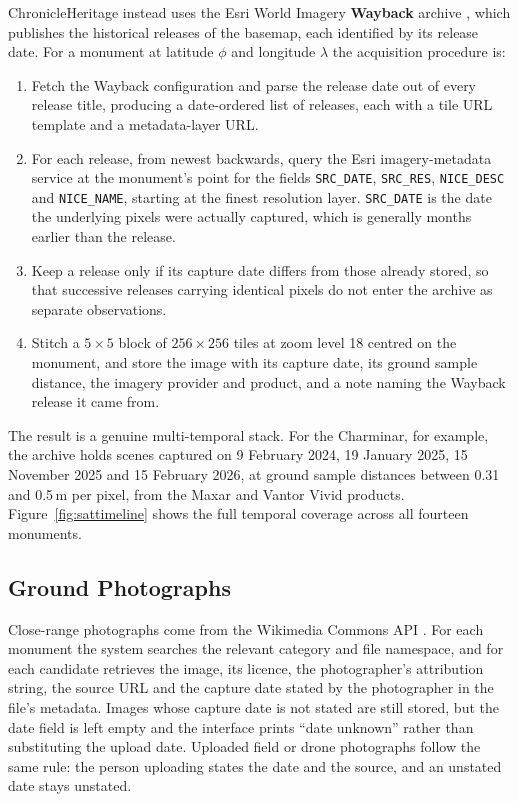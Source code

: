 \documentclass[a4paper,12pt,oneside]{book}
\begin{document}
ChronicleHeritage instead uses the Esri World Imagery \textbf{Wayback} archive \cite{esriwayback}, which publishes the historical releases of the basemap, each identified by its release date. For a monument at latitude $\phi$ and longitude $\lambda$ the acquisition procedure is:

\begin{enumerate}
    \item Fetch the Wayback configuration and parse the release date out of every release title, producing a date-ordered list of releases, each with a tile URL template and a metadata-layer URL.
    \item For each release, from newest backwards, query the Esri imagery-metadata service at the monument's point for the fields \texttt{SRC\_DATE}, \texttt{SRC\_RES}, \texttt{NICE\_DESC} and \texttt{NICE\_NAME}, starting at the finest resolution layer. \texttt{SRC\_DATE} is the date the underlying pixels were actually captured, which is generally months earlier than the release.
    \item Keep a release only if its capture date differs from those already stored, so that successive releases carrying identical pixels do not enter the archive as separate observations.
    \item Stitch a $5\times5$ block of $256\times256$ tiles at zoom level 18 centred on the monument, and store the image with its capture date, its ground sample distance, the imagery provider and product, and a note naming the Wayback release it came from.
\end{enumerate}

The result is a genuine multi-temporal stack. For the Charminar, for example, the archive holds scenes captured on 9 February 2024, 19 January 2025, 15 November 2025 and 15 February 2026, at ground sample distances between 0.31 and 0.5\,m per pixel, from the Maxar and Vantor Vivid products. Figure~\ref{fig:sattimeline} shows the full temporal coverage across all fourteen monuments.

\subsection{Ground Photographs}
Close-range photographs come from the Wikimedia Commons API \cite{wikicommons}. For each monument the system searches the relevant category and file namespace, and for each candidate retrieves the image, its licence, the photographer's attribution string, the source URL and the capture date stated by the photographer in the file's metadata. Images whose capture date is not stated are still stored, but the date field is left empty and the interface prints ``date unknown'' rather than substituting the upload date. Uploaded field or drone photographs follow the same rule: the person uploading states the date and the source, and an unstated date stays unstated.
\end{document}
